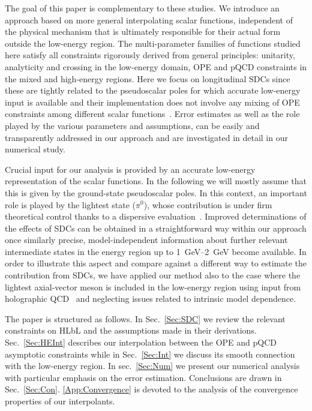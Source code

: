 The goal of this paper is complementary to these studies. We introduce an approach based on more general interpolating scalar functions, independent of the physical mechanism that is ultimately responsible for their actual form outside the low-energy region. The multi-parameter families of functions studied here satisfy all constraints rigorously derived from general principles: unitarity, analyticity and crossing in the low-energy domain, OPE and pQCD constraints in the mixed and high-energy regions. Here we focus on longitudinal SDCs since these are tightly related to the pseudoscalar poles for which accurate low-energy input is available and 
their implementation does not involve any mixing of OPE constraints among different scalar functions~\cite{BernSDCLong}. Error estimates as well as the role played by the various parameters and assumptions, can be easily and transparently addressed in our approach and are investigated in detail in our numerical study. 

Crucial input for our analysis is provided by an accurate low-energy representation of the scalar functions. In the following we will mostly assume that this is given by the ground-state pseudoscalar poles. In this context, an important role is played by the lightest state ($\pi^0$), whose contribution is under firm theoretical control thanks to a dispersive evaluation~\cite{Hoferichter:2014vra,PionTFFshort,PionTFF}. Improved determinations of the effects of SDCs can be obtained in a straightforward way within our approach once similarly precise, model-independent information about further relevant intermediate states in the energy region up to \SIrange[range-units=single, range-phrase=--]{1}{2}{\GeV} become available. In order to illustrate this aspect and compare against a different way to estimate the contribution from SDCs, we have applied our method also to the case where the lightest axial-vector meson is included in the low-energy region using input from holographic QCD~\cite{HolographyVienna,HolographyItaly} and neglecting issues related to intrinsic model dependence.

The paper is structured as follows. In Sec.~\ref{Sec:SDC} we review the relevant constraints on HLbL and the assumptions made in their derivations. Sec.~\ref{Sec:HEInt} describes our interpolation between the OPE and pQCD asymptotic constraints while in Sec.~\ref{Sec:Int} we discuss its smooth connection with the low-energy region. In sec.~\ref{Sec:Num} we present our numerical analysis with particular emphasis on the error estimation. Conclusions are drawn in Sec.~\ref{Sec:Con}. \ref{App:Convergence} is devoted to the analysis of the convergence properties of our interpolants.